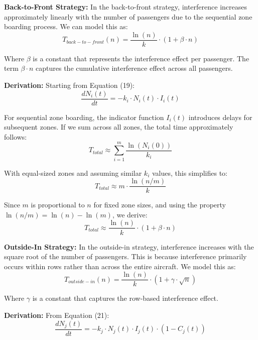 \textbf{Back-to-Front Strategy:}
In the back-to-front strategy, interference increases approximately linearly with the number of passengers due to the sequential zone boarding process. We can model this as:
\begin{equation}
T_{back-to-front}(n) = \frac{\ln(n)}{k} \cdot (1 + \beta \cdot n)
\end{equation}

Where $\beta$ is a constant that represents the interference effect per passenger. The term $\beta \cdot n$ captures the cumulative interference effect across all passengers.

\textbf{Derivation:} Starting from Equation (19):
\begin{equation}
\frac{dN_i(t)}{dt} = -k_i \cdot N_i(t) \cdot I_i(t)
\end{equation}

For sequential zone boarding, the indicator function $I_i(t)$ introduces delays for subsequent zones. If we sum across all zones, the total time approximately follows:
\begin{equation}
T_{total} \approx \sum_{i=1}^{m} \frac{\ln(N_i(0))}{k_i}
\end{equation}

With equal-sized zones and assuming similar $k_i$ values, this simplifies to:
\begin{equation}
T_{total} \approx m \cdot \frac{\ln(n/m)}{k}
\end{equation}

Since $m$ is proportional to $n$ for fixed zone sizes, and using the property $\ln(n/m) = \ln(n) - \ln(m)$, we derive:
\begin{equation}
T_{total} \approx \frac{\ln(n)}{k} \cdot (1 + \beta \cdot n)
\end{equation}

\textbf{Outside-In Strategy:}
In the outside-in strategy, interference increases with the square root of the number of passengers. This is because interference primarily occurs within rows rather than across the entire aircraft. We model this as:
\begin{equation}
T_{outside-in}(n) = \frac{\ln(n)}{k} \cdot (1 + \gamma \cdot \sqrt{n})
\end{equation}

Where $\gamma$ is a constant that captures the row-based interference effect.

\textbf{Derivation:} From Equation (21):
\begin{equation}
\frac{dN_j(t)}{dt} = -k_j \cdot N_j(t) \cdot I_j(t) \cdot (1 - C_j(t))
\end{equation}

